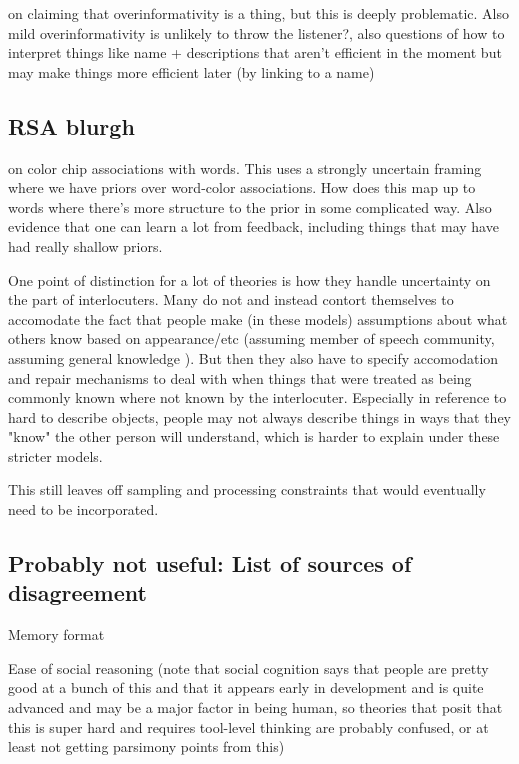 \documentclass[]{article}
\begin{document}
\cite{heller2012} on claiming that overinformativity is a thing, but this is deeply problematic. Also mild overinformativity is unlikely to throw the listener?, also questions of how to interpret things like name + descriptions that aren't efficient in the moment but may make things more efficient later (by linking to a name) 


\subsection{RSA blurgh}

\cite{murthy2022} on color chip associations with words. This uses a strongly uncertain framing where we have priors over word-color associations. How does this map up to words where there's more structure to the prior in some complicated way. Also evidence that one can learn a lot from feedback, including things that may have had really shallow priors. 


One point of distinction for a lot of theories is how they handle uncertainty on the part of interlocuters. Many do not and instead contort themselves to accomodate the fact that people make (in these models) assumptions about what others know based on appearance/etc (assuming member of speech community, assuming general knowledge ). But then they also have to specify accomodation and repair mechanisms to deal with when things that were treated as being commonly known where not known by the interlocuter. Especially in reference to hard to describe objects, people may not always describe things in ways that they "know" the other person will understand, which is harder to explain under these stricter models. 

This still leaves off sampling and processing constraints that would eventually need to be incorporated.

\subsection{Probably not useful: List of sources of disagreement}

Memory format 

Ease of social reasoning (note that social cognition says that people are pretty good at a bunch of this and that it appears early in development and is quite advanced and may be a major factor in being human, so theories that posit that this is super hard and requires tool-level thinking are probably confused, or at least not getting parsimony points from this)
\end{document}
